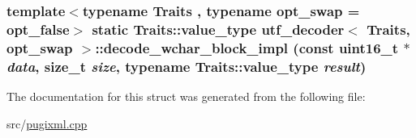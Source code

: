 \label{structutf__decoder_a3bd423d3ce99b245c76be8a0796d951b}
\hypertarget{structutf__decoder_a56b161067860fde1ed534ac3b7399e36}{
\subsubsection[{decode\_\-wchar\_\-block\_\-impl}]{\setlength{\rightskip}{0pt plus 5cm}template$<$typename Traits , typename opt\_\-swap  = opt\_\-false$>$ static Traits::value\_\-type {\bf utf\_\-decoder}$<$ Traits, opt\_\-swap $>$::decode\_\-wchar\_\-block\_\-impl (const uint16\_\-t $\ast$ {\em data}, \/  size\_\-t {\em size}, \/  typename Traits::value\_\-type {\em result})}}
\label{structutf__decoder_a56b161067860fde1ed534ac3b7399e36}


The documentation for this struct was generated from the following file:\begin{DoxyCompactItemize}
\item 
src/\hyperlink{pugixml_8cpp}{pugixml.cpp}\end{DoxyCompactItemize}
